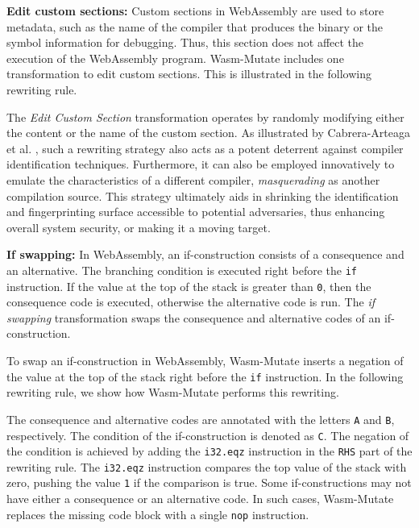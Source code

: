 \documentclass[a4paper,fleqn]{cas-dc}
\newcommand{\tool}{{\sc Wasm-Mutate}\xspace}
\begin{document}
\textbf{Edit custom sections:}
Custom sections in WebAssembly are used to store metadata, such as the name of the compiler that produces the binary or the symbol information for debugging.
Thus, this section does not affect the execution of the WebAssembly program.
\tool includes one transformation to edit custom sections. 
This is illustrated in the following rewriting rule. 



The \emph{Edit Custom Section} transformation operates by randomly modifying either the content or the name of the custom section. 
As illustrated by Cabrera-Arteaga et al. \cite{CABRERAARTEAGA2023103296}, such a rewriting strategy also acts as a potent deterrent against compiler identification techniques.
Furthermore, it can also be employed innovatively to emulate the characteristics of a different compiler, \emph{masquerading} as another compilation source. 
This strategy ultimately aids in shrinking the identification and fingerprinting surface accessible to potential adversaries, thus enhancing overall system security, or making it a moving target.



\textbf{If swapping:} In WebAssembly, an if-construction consists of a consequence and an alternative. The branching condition is executed right before the \texttt{if} instruction.
If the value at the top of the stack is greater than \texttt{0}, then the consequence code is executed, otherwise the alternative code is run.
The \emph{if swapping} transformation swaps the consequence and alternative codes of an if-construction.


To swap an if-construction in WebAssembly, \tool inserts a negation of the value at the top of the stack right before the \texttt{if} instruction.
In the following rewriting rule, we show how \tool performs this rewriting.

The consequence and alternative codes are annotated with the letters \texttt{A} and \texttt{B}, respectively.
The condition of the if-construction is denoted as \texttt{C}.
The negation of the condition is achieved by adding the \texttt{i32.eqz} instruction in the \texttt{RHS} part of the rewriting rule.
The \texttt{i32.eqz} instruction compares the top value of the stack with zero, pushing the value \texttt{1} if the comparison is true.
Some if-constructions may not have either a consequence or an alternative code.
In such cases, \tool replaces the missing code block with a single \texttt{nop} instruction.
\end{document}
